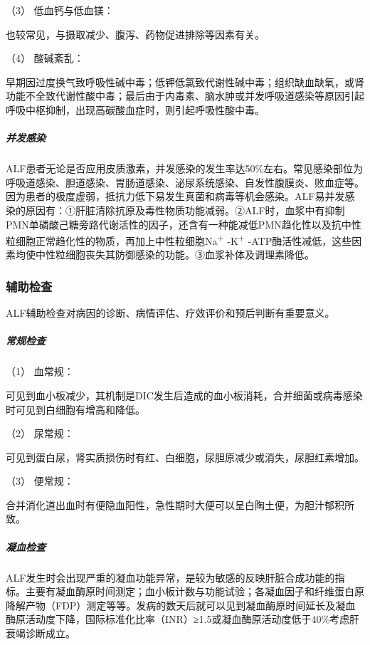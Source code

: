 \hypertarget{text00082.htmlux5cux23CHP3-6-2-2-1-2-7-3}{}
（3） 低血钙与低血镁：

也较常见，与摄取减少、腹泻、药物促进排除等因素有关。

\hypertarget{text00082.htmlux5cux23CHP3-6-2-2-1-2-7-4}{}
（4） 酸碱紊乱：

早期因过度换气致呼吸性碱中毒；低钾低氯致代谢性碱中毒；组织缺血缺氧，或肾功能不全致代谢性酸中毒；最后由于内毒素、脑水肿或并发呼吸道感染等原因引起呼吸中枢抑制，出现高碳酸血症时，则引起呼吸性酸中毒。

\subparagraph{并发感染}

ALF患者无论是否应用皮质激素，并发感染的发生率达50\%左右。常见感染部位为呼吸道感染、胆道感染、胃肠道感染、泌尿系统感染、自发性腹膜炎、败血症等。因为患者的极度虚弱，抵抗力低下易发生真菌和病毒等机会感染。ALF易并发感染的原因有：①肝脏清除抗原及毒性物质功能减弱。②ALF时，血浆中有抑制PMN单磷酸己糖旁路代谢活性的因子，还含有一种能减低PMN趋化性以及抗中性粒细胞正常趋化性的物质，再加上中性粒细胞Na\textsuperscript{+}
-K\textsuperscript{+}
-ATP酶活性减低，这些因素均使中性粒细胞丧失其防御感染的功能。③血浆补体及调理素降低。

\subsubsection{辅助检查}

ALF辅助检查对病因的诊断、病情评估、疗效评价和预后判断有重要意义。

\subparagraph{常规检查}

\hypertarget{text00082.htmlux5cux23CHP3-6-2-2-2-1-1}{}
（1） 血常规：

可见到血小板减少，其机制是DIC发生后造成的血小板消耗，合并细菌或病毒感染时可见到白细胞有增高和降低。

\hypertarget{text00082.htmlux5cux23CHP3-6-2-2-2-1-2}{}
（2） 尿常规：

可见到蛋白尿，肾实质损伤时有红、白细胞，尿胆原减少或消失，尿胆红素增加。

\hypertarget{text00082.htmlux5cux23CHP3-6-2-2-2-1-3}{}
（3） 便常规：

合并消化道出血时有便隐血阳性，急性期时大便可以呈白陶土便，为胆汁郁积所致。

\subparagraph{凝血检查}

ALF发生时会出现严重的凝血功能异常，是较为敏感的反映肝脏合成功能的指标。主要有凝血酶原时间测定；血小板计数与功能试验；各凝血因子和纤维蛋白原降解产物（FDP）测定等等。发病的数天后就可以见到凝血酶原时间延长及凝血酶原活动度下降，国际标准化比率（INR）≥1.5或凝血酶原活动度低于40\%考虑肝衰竭诊断成立。

